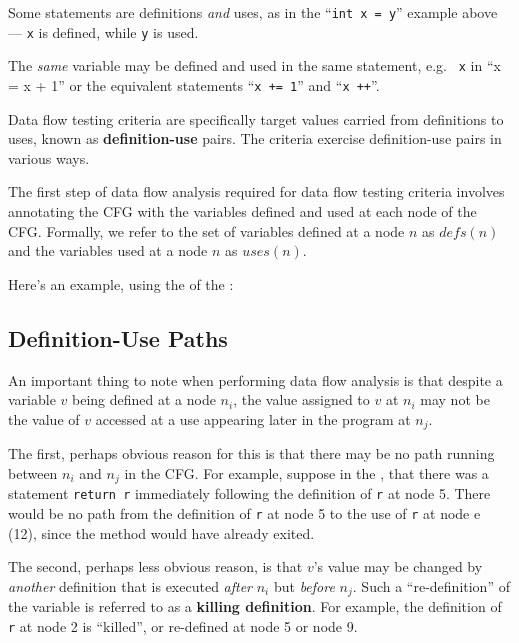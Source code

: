 Some statements are definitions {\it and} uses, as in the ``{\tt int x = y}''
example above --- {\tt x} is defined, while {\tt y} is used. 

The {\it same} variable may be defined and used in the same statement, e.g. {\tt
x} in ``{x = x + 1}'' or the equivalent statements ``{\tt x += 1}'' and ``{\tt x ++}''.

Data flow testing criteria are specifically target values carried from
definitions to uses, known as {\bf definition-use} pairs. The criteria exercise
definition-use pairs in various ways.

The first step of data flow analysis required for data flow testing criteria
involves annotating the CFG with the variables defined and used at each node of
the CFG. Formally, we refer to the set of variables defined at a node $n$ as
$\mathit{defs}(n)$ and the variables used at a node $n$ as $\mathit{uses}(n)$.

Here's an example, using the \signmethod of the \signutilsclass:


\subsection{Definition-Use Paths}


An important thing to note when performing data flow analysis is that despite a
variable $v$ being defined at a node $n_i$, the value assigned to $v$ at $n_i$
may not be the value of $v$ accessed at a use appearing later in the program at
$n_j$.

The first, perhaps obvious reason for this is that there may be no path running
between $n_i$ and $n_j$ in the CFG. For example, suppose in the \signmethod,
that there was a statement {\tt return r} immediately following the definition
of {\tt r} at node 5. There would be no path from the definition of {\tt r} at
node 5 to the use of {\tt r} at node e (12), since the method would have already
exited.

The second, perhaps less obvious reason, is that $v$'s value may be changed by
{\it another} definition that is executed {\it after} $n_i$ but {\it before}
$n_j$. Such a ``re-definition'' of the variable is referred to as a {\bf killing
definition}. For example, the definition of {\tt r} at node 2 is ``killed'', or
re-defined at node 5 or node 9. 

